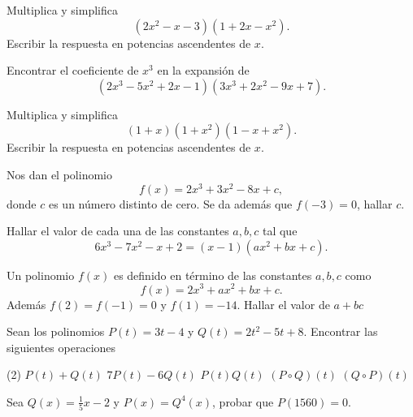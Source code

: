 \begin{multicols}{2}
    \begin{exercise}
        Multiplica y simplifica
        \[
            (2x^2 - x - 3)(1 + 2x - x^2).
        \]
        Escribir la respuesta en potencias ascendentes de $x$.
    \end{exercise}

    \begin{exercise}
        Encontrar el coeficiente de $x^3$ en la expansión de
        \[
            (2x^3 - 5x^2 + 2x - 1)(3x^3 + 2x^2 - 9x + 7).
        \]
    \end{exercise}

    \begin{exercise}
        Multiplica y simplifica
        \[
            (1 + x)(1 + x^2)(1 - x + x^2).
        \]
        Escribir la respuesta en potencias ascendentes de $x$.
    \end{exercise}

    \begin{exercise}
        Nos dan el polinomio
        \[
            f(x) = 2x^3 + 3x^2 - 8x + c,
        \]
        donde $c$ es un número distinto de cero.
        Se da además que $f(-3) = 0$, hallar $c$.
    \end{exercise}

    \begin{exercise}
        Hallar el valor de cada una de las constantes $a, b, c$ tal que
        \[
            6x^3 - 7x^2 - x + 2 = (x - 1)(ax^2 + bx + c).
        \]
    \end{exercise}

    \begin{exercise}
        Un polinomio $f(x)$ es definido en término de las constantes $a, b, c$ como
        \[
            f(x) = 2x^3 + ax^2 + bx + c.
        \]
        Además $f(2) = f(-1) = 0$ y $f(1) = -14$.
        Hallar el valor de $a + bc$
    \end{exercise}

    \begin{exercise}
        Sean los polinomios $P(t) = 3t - 4$ y $Q(t) = 2t^2 - 5t + 8$.
        Encontrar las siguientes operaciones
        \begin{tasks}(2)
            \task $P(t) + Q(t)$
            \task $7P(t) - 6Q(t)$
            \task $P(t)Q(t)$
            \task $(P \circ Q)(t)$
            \task $(Q \circ P)(t)$
        \end{tasks}
    \end{exercise}

    \begin{exercise}
        Sea $Q(x) = \frac{1}{5} x - 2$ y $P(x) = Q^4(x)$, probar que $P(1560) = 0$.
    \end{exercise}


\end{multicols}
